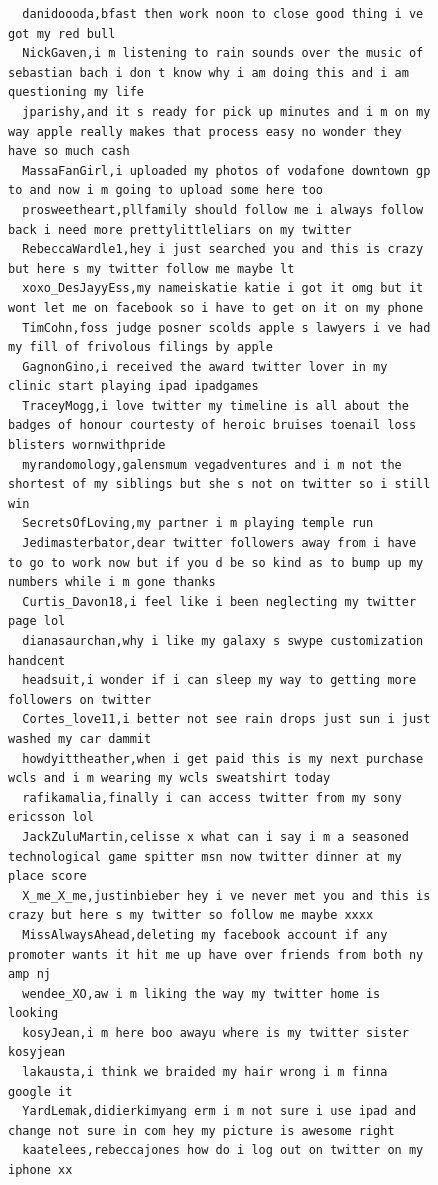 \begin{figure}[htpb]
\begin{verbatim}
  danidoooda,bfast then work noon to close good thing i ve got my red bull
  NickGaven,i m listening to rain sounds over the music of sebastian bach i don t know why i am doing this and i am questioning my life
  jparishy,and it s ready for pick up minutes and i m on my way apple really makes that process easy no wonder they have so much cash
  MassaFanGirl,i uploaded my photos of vodafone downtown gp to and now i m going to upload some here too
  prosweetheart,pllfamily should follow me i always follow back i need more prettylittleliars on my twitter
  RebeccaWardle1,hey i just searched you and this is crazy but here s my twitter follow me maybe lt
  xoxo_DesJayyEss,my nameiskatie katie i got it omg but it wont let me on facebook so i have to get on it on my phone
  TimCohn,foss judge posner scolds apple s lawyers i ve had my fill of frivolous filings by apple
  GagnonGino,i received the award twitter lover in my clinic start playing ipad ipadgames
  TraceyMogg,i love twitter my timeline is all about the badges of honour courtesty of heroic bruises toenail loss blisters wornwithpride
  myrandomology,galensmum vegadventures and i m not the shortest of my siblings but she s not on twitter so i still win
  SecretsOfLoving,my partner i m playing temple run
  Jedimasterbator,dear twitter followers away from i have to go to work now but if you d be so kind as to bump up my numbers while i m gone thanks
  Curtis_Davon18,i feel like i been neglecting my twitter page lol
  dianasaurchan,why i like my galaxy s swype customization handcent
  headsuit,i wonder if i can sleep my way to getting more followers on twitter
  Cortes_love11,i better not see rain drops just sun i just washed my car dammit
  howdyittheather,when i get paid this is my next purchase wcls and i m wearing my wcls sweatshirt today
  rafikamalia,finally i can access twitter from my sony ericsson lol
  JackZuluMartin,celisse x what can i say i m a seasoned technological game spitter msn now twitter dinner at my place score
  X_me_X_me,justinbieber hey i ve never met you and this is crazy but here s my twitter so follow me maybe xxxx
  MissAlwaysAhead,deleting my facebook account if any promoter wants it hit me up have over friends from both ny amp nj
  wendee_XO,aw i m liking the way my twitter home is looking
  kosyJean,i m here boo awayu where is my twitter sister kosyjean
  lakausta,i think we braided my hair wrong i m finna google it
  YardLemak,didierkimyang erm i m not sure i use ipad and change not sure in com hey my picture is awesome right
  kaatelees,rebeccajones how do i log out on twitter on my iphone xx

\end{verbatim}
\end{figure}
